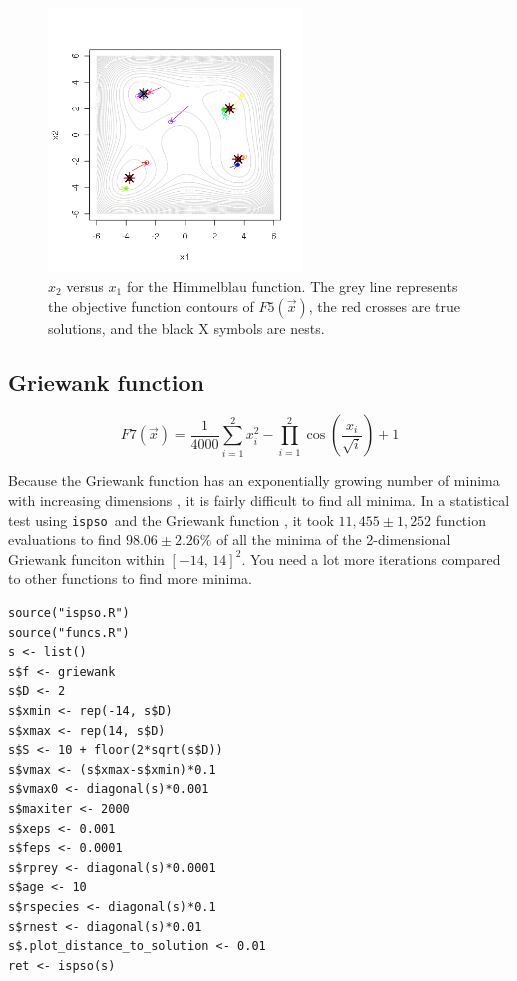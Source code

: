 \documentclass{article}
\def\ispso{\texttt{ispso}}
\begin{document}
\begin{figure}[htbp]
  \centering
  \includegraphics[width=0.6\textwidth]{himmelblau.png}
  \caption{$x_2$ versus $x_1$ for the Himmelblau function. The grey line represents the objective function contours of $F5(\vec{x})$, the red crosses are true solutions, and the black X symbols are nests.}
\end{figure}

\subsection{Griewank function}

\begin{equation*}
  F7(\vec{x})=
    \frac{1}{4000}\sum_{i=1}^2x_i^2
    -\prod_{i=1}^2\cos\left(\frac{x_i}{\sqrt{i}}\right)+1
\end{equation*}

Because the Griewank function has an exponentially growing number of minima with increasing dimensions \citep{Cho.ea.2008}, it is fairly difficult to find all minima.
In a statistical test using \ispso\ and the Griewank function \citep{Cho.2008}, it took $11,455\pm 1,252$ function evaluations to find $98.06\pm 2.26\%$ of all the minima of the 2-dimensional Griewank funciton within $[-14,\,14]^2$.
You need a lot more iterations compared to other functions to find more minima.

\begin{verbatim}
source("ispso.R")
source("funcs.R")
s <- list()
s$f <- griewank
s$D <- 2
s$xmin <- rep(-14, s$D)
s$xmax <- rep(14, s$D)
s$S <- 10 + floor(2*sqrt(s$D))
s$vmax <- (s$xmax-s$xmin)*0.1
s$vmax0 <- diagonal(s)*0.001
s$maxiter <- 2000
s$xeps <- 0.001
s$feps <- 0.0001
s$rprey <- diagonal(s)*0.0001
s$age <- 10
s$rspecies <- diagonal(s)*0.1
s$rnest <- diagonal(s)*0.01
s$.plot_distance_to_solution <- 0.01
ret <- ispso(s)
\end{verbatim}
\end{document}

